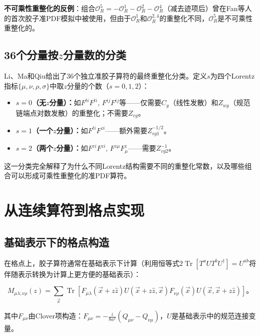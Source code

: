 \documentclass[12pt,a4paper]{ctexart}
\theoremstyle{definition}
\begin{document}
\textbf{不可乘性重整化的反例}\cite{Zhang2019}：组合$\mathcal{O}^5_R = -\mathcal{O}^1_R - \mathcal{O}^2_R - \mathcal{O}^4_R$（减去迹项后）曾在Fan等人的首次胶子准PDF模拟中被使用\cite{Fan2018gluon}，但由于$\mathcal{O}^1_R$和$\mathcal{O}^{2,4}_R$的重整化不同，$\mathcal{O}^5_R$是不可乘性重整化的。

\subsection{36个分量按$z$分量数的分类}

Li、Ma和Qiu\cite{Li2018multiplicative}给出了36个独立准胶子算符的最终重整化分类。定义$s$为四个Lorentz指标$\{\mu,\nu,\rho,\sigma\}$中取$z$分量的个数（$s = 0,1,2$）：

\begin{itemize}
    \item \textbf{$s=0$（无$z$分量）：}如$F^{ti}F^{ti}$, $F^{ij}F^{ij}$等——仅需要$C_g$（线性发散）和$Z_{wg}$（规范链端点对数发散）的重整化；不需要$Z_{vg}$。
    \item \textbf{$s=1$（一个$z$分量）：}如$F^{ti}F^{zi}$——额外需要$Z^{-1/2}_{vg1}$。
    \item \textbf{$s=2$（两个$z$分量）：}如$F^{zi}F^{zi}$, $F^{z\mu}F^z_\mu$——需要$Z^{-1}_{vg2}$。
\end{itemize}

这一分类完全解释了为什么不同Lorentz结构需要不同的重整化常数，以及哪些组合可以形成可乘性重整化的准PDF算符。

\section{从连续算符到格点实现}

\subsection{基础表示下的格点构造}

在格点上，胶子算符通常在基础表示下计算（利用恒等式$2\operatorname{Tr}[T^a U T^b U^\dagger] = U^{ab}$将伴随表示转换为计算上更方便的基础表示）\cite{Chen2025gluon,NoteGluonPDFs}：

\begin{equation}
M_{\mu\lambda;\nu\rho}(z) = \sum_{\vec{x}} \operatorname{Tr}[F_{\mu\lambda}(\vec{x} + z\hat{z}) U(\vec{x} + z\hat{z}, \vec{x}) F_{\nu\rho}(\vec{x}) U(\vec{x}, \vec{x} + z\hat{z})]。
\label{eq:lattice_ME}
\end{equation}

其中$F_{\mu\nu}$由Clover项构造：$F_{\mu\nu} = -\frac{i}{8a^2}(Q_{\mu\nu} - Q_{\nu\mu})$，$U$是基础表示中的规范连接变量。
\end{document}
